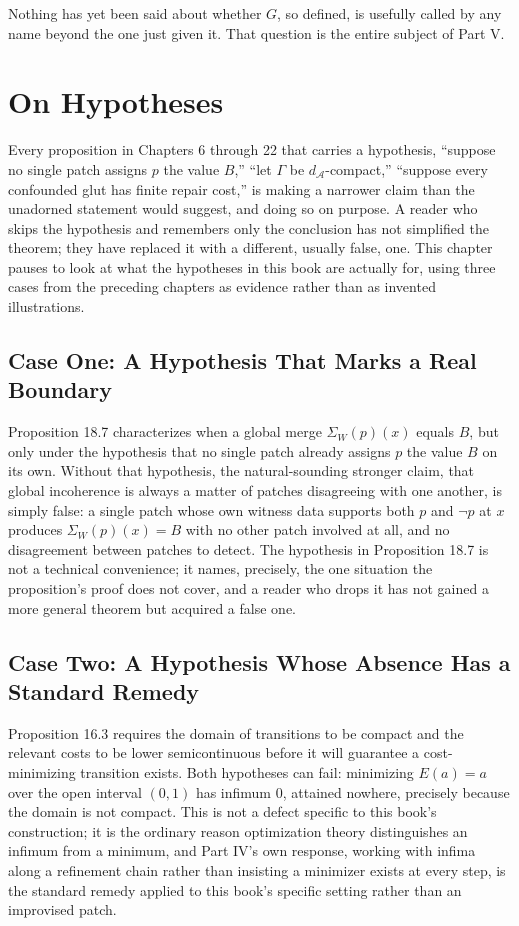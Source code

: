 \documentclass[11pt]{book}
\begin{document}
Nothing has yet been said about whether $G$, so defined, is usefully called by any name beyond the one just given it. That question is the entire subject of Part V.

\chapter*{On Hypotheses}

Every proposition in Chapters 6 through 22 that carries a hypothesis, ``suppose no single patch assigns $p$ the value $B$,'' ``let $\Gamma$ be $d_{\mathcal A}$-compact,'' ``suppose every confounded glut has finite repair cost,'' is making a narrower claim than the unadorned statement would suggest, and doing so on purpose. A reader who skips the hypothesis and remembers only the conclusion has not simplified the theorem; they have replaced it with a different, usually false, one. This chapter pauses to look at what the hypotheses in this book are actually for, using three cases from the preceding chapters as evidence rather than as invented illustrations.

\section*{Case One: A Hypothesis That Marks a Real Boundary}

Proposition 18.7 characterizes when a global merge $\Sigma_W(p)(x)$ equals $B$, but only under the hypothesis that no single patch already assigns $p$ the value $B$ on its own. Without that hypothesis, the natural-sounding stronger claim, that global incoherence is always a matter of patches disagreeing with one another, is simply false: a single patch whose own witness data supports both $p$ and $\neg p$ at $x$ produces $\Sigma_W(p)(x) = B$ with no other patch involved at all, and no disagreement between patches to detect. The hypothesis in Proposition 18.7 is not a technical convenience; it names, precisely, the one situation the proposition's proof does not cover, and a reader who drops it has not gained a more general theorem but acquired a false one.

\section*{Case Two: A Hypothesis Whose Absence Has a Standard Remedy}

Proposition 16.3 requires the domain of transitions to be compact and the relevant costs to be lower semicontinuous before it will guarantee a cost-minimizing transition exists. Both hypotheses can fail: minimizing $E(a) = a$ over the open interval $(0,1)$ has infimum $0$, attained nowhere, precisely because the domain is not compact. This is not a defect specific to this book's construction; it is the ordinary reason optimization theory distinguishes an infimum from a minimum, and Part IV's own response, working with infima along a refinement chain rather than insisting a minimizer exists at every step, is the standard remedy applied to this book's specific setting rather than an improvised patch.
\end{document}
